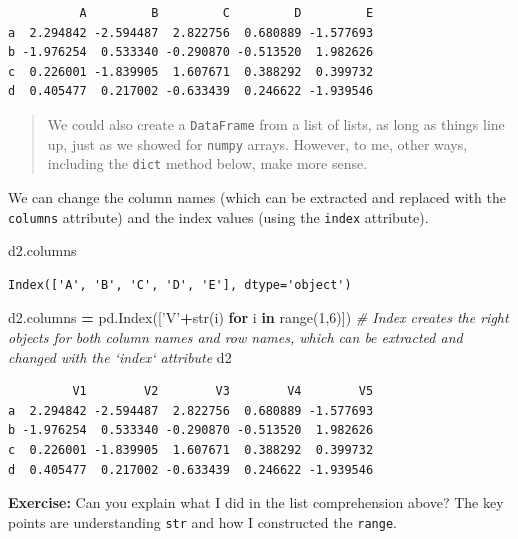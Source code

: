 \documentclass[
  letterpaper,
]{scrbook}
\newenvironment{Shaded}{\begin{snugshade}}{\end{snugshade}}
\newcommand{\BuiltInTok}[1]{#1}
\newcommand{\CommentTok}[1]{\textcolor[rgb]{0.56,0.35,0.01}{\textit{#1}}}
\newcommand{\ControlFlowTok}[1]{\textcolor[rgb]{0.13,0.29,0.53}{\textbf{#1}}}
\newcommand{\DecValTok}[1]{\textcolor[rgb]{0.00,0.00,0.81}{#1}}
\newcommand{\KeywordTok}[1]{\textcolor[rgb]{0.13,0.29,0.53}{\textbf{#1}}}
\newcommand{\NormalTok}[1]{#1}
\newcommand{\OperatorTok}[1]{\textcolor[rgb]{0.81,0.36,0.00}{\textbf{#1}}}
\newcommand{\StringTok}[1]{\textcolor[rgb]{0.31,0.60,0.02}{#1}}
\begin{document}
\begin{verbatim}
          A         B         C         D         E
a  2.294842 -2.594487  2.822756  0.680889 -1.577693
b -1.976254  0.533340 -0.290870 -0.513520  1.982626
c  0.226001 -1.839905  1.607671  0.388292  0.399732
d  0.405477  0.217002 -0.633439  0.246622 -1.939546
\end{verbatim}

\begin{quote}
We could also create a \texttt{DataFrame} from a list of lists, as long as things line up, just as we showed for \texttt{numpy} arrays. However, to me, other ways, including the \texttt{dict} method below, make more sense.
\end{quote}

We can change the column names (which can be extracted and replaced with the \texttt{columns} attribute) and the index values (using the \texttt{index} attribute).

\begin{Shaded}
\begin{Highlighting}[]
\NormalTok{d2.columns}
\end{Highlighting}
\end{Shaded}

\begin{verbatim}
Index(['A', 'B', 'C', 'D', 'E'], dtype='object')
\end{verbatim}

\begin{Shaded}
\begin{Highlighting}[]
\NormalTok{d2.columns }\OperatorTok{=}\NormalTok{ pd.Index([}\StringTok{'V'}\OperatorTok{+}\BuiltInTok{str}\NormalTok{(i) }\ControlFlowTok{for}\NormalTok{ i }\KeywordTok{in} \BuiltInTok{range}\NormalTok{(}\DecValTok{1}\NormalTok{,}\DecValTok{6}\NormalTok{)]) }\CommentTok{# Index creates the right objects for both column names and row names, which can be extracted and changed with the `index` attribute}
\NormalTok{d2}
\end{Highlighting}
\end{Shaded}

\begin{verbatim}
         V1        V2        V3        V4        V5
a  2.294842 -2.594487  2.822756  0.680889 -1.577693
b -1.976254  0.533340 -0.290870 -0.513520  1.982626
c  0.226001 -1.839905  1.607671  0.388292  0.399732
d  0.405477  0.217002 -0.633439  0.246622 -1.939546
\end{verbatim}

\textbf{Exercise:} Can you explain what I did in the list comprehension above? The key points are understanding \texttt{str} and how I constructed the \texttt{range}.
\end{document}
